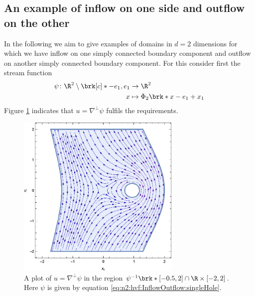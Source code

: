 \subsection{An example of inflow on one side and outflow on the other}
In the following we aim to give examples of domains in $d=2$ dimensions for which 
we have inflow on one simply connected boundary component and outflow on another simply connected boundary
component.
For this consider first the stream function
\begin{equation}
  \begin{aligned}
  \psi\colon \R^2\setminus\brk[c]*{-e_1,e_1}&\to\R^2 \\
  x&\mapsto\Phi_2\brk*{x-e_1}+x_1
  \end{aligned}\label{eq:n2:hvf:InflowOutflow:singleHole}
\end{equation}
Figure \ref{pl:n2_hvf_InflowOutflow_asymmetric_single} indicates that $u=\nabla^\perp\psi$ fulfils the
requirements.
\begin{figure}
  \centering
  \includegraphics[width=0.7\textwidth]{../Plots/HarmonicVectorFields_gr3.eps}
  \caption{A plot of $u=\nabla^\perp\psi$ in the region $\psi^{-1}\brk*{[-0.5,2]}\cap \R\times[-2,2]$.
  Here $\psi$ is given by equation \eqref{eq:n2:hvf:InflowOutflow:singleHole}.}
  \label{pl:n2_hvf_InflowOutflow_asymmetric_single}
\end{figure}

